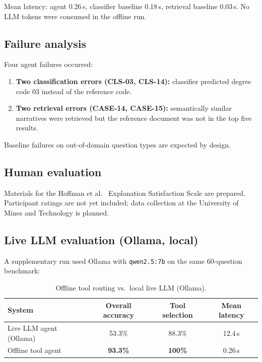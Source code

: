 \documentclass[11pt,a4paper]{article}
\begin{document}
Mean latency: agent 0.26\,s, classifier baseline 0.18\,s, retrieval baseline
0.03\,s. No LLM tokens were consumed in the offline run.

\subsection{Failure analysis}

Four agent failures occurred:
\begin{enumerate}
  \item \textbf{Two classification errors (CLS-03, CLS-14):} classifier
    predicted degree code 03 instead of the reference code.
  \item \textbf{Two retrieval errors (CASE-14, CASE-15):} semantically similar
    narratives were retrieved but the reference document was not in the top five
    results.
\end{enumerate}
Baseline failures on out-of-domain question types are expected by design.

\subsection{Human evaluation}

Materials for the Hoffman et al.~\cite{Hoffman2023} Explanation Satisfaction
Scale are prepared. Participant ratings are not yet included; data collection at
the University of Mines and Technology is planned.

\subsection{Live LLM evaluation (Ollama, local)}
\label{sec:live-llm}

A supplementary run used Ollama with \texttt{qwen2.5:7b} on the same 60-question
benchmark:

\begin{table}[htbp]
  \centering
  \caption{Offline tool routing vs.\ local live LLM (Ollama).}
  \label{tab:ollama}
  \begin{tabular}{@{}lccc@{}}
    \toprule
    System & Overall accuracy & Tool selection & Mean latency \\
    \midrule
    Live LLM agent (Ollama) & 53.3\% & 88.3\% & 12.4\,s \\
    Offline tool agent & \textbf{93.3\%} & \textbf{100\%} & 0.26\,s \\
    \bottomrule
  \end{tabular}
\end{table}
\end{document}
